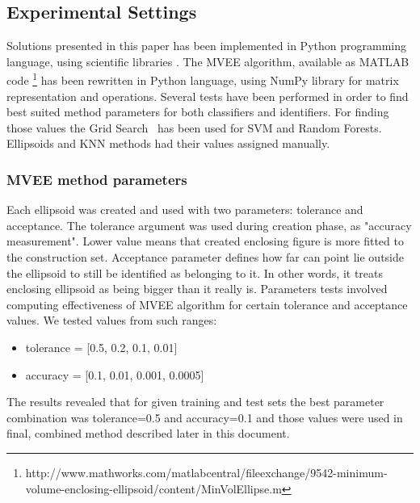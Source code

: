 \documentclass{llncs}
\begin{document}
\vspace{-6pt}
\subsection{Experimental Settings}
\vspace{-3pt}

Solutions presented in this paper has been implemented in Python programming language, using scientific libraries \cite{MatLab,NumPy,Scikit}. %
The MVEE algorithm, available as MATLAB code \footnote{http://www.mathworks.com/matlabcentral/fileexchange/9542-minimum-volume-enclosing-ellipsoid/content/MinVolEllipse.m} has been rewritten in Python language, using NumPy library for matrix representation and operations. Several tests have been performed in order to find best suited method parameters for both classifiers and identifiers. For finding those values the Grid Search~\cite{Scikit} %
has been used for SVM and Random Forests. Ellipsoids and KNN methods had their values assigned manually. 

\vspace{-6pt}
\subsubsection{MVEE method parameters}
Each ellipsoid was created and used with two parameters: tolerance and acceptance. The tolerance argument was used during creation phase, as "accuracy measurement". Lower value means that created enclosing figure is more fitted to the construction set. Acceptance parameter defines how far can point lie outside the ellipsoid to still be identified as belonging to it. In other words, it treats enclosing ellipsoid as being bigger than it really is.
Parameters tests involved computing effectiveness of MVEE algorithm for certain tolerance and acceptance values. We tested values from such ranges:\vspace{-6pt}
\begin{itemize}
	\item tolerance = [0.5, 0.2, 0.1, 0.01]
	\item accuracy = [0.1, 0.01, 0.001, 0.0005]
\end{itemize} 
The results revealed that for given training and test sets the best parameter combination was tolerance=0.5 and accuracy=0.1 and those values were used in final, combined method described later in this document.
\end{document}
